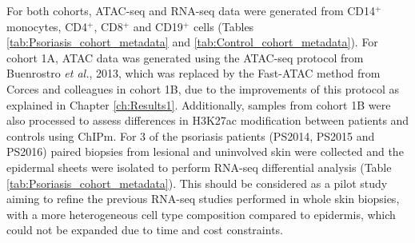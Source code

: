 For both cohorts, ATAC-seq and RNA-seq data were generated from CD14$^+$ monocytes, CD4$^+$, CD8$^+$ and CD19$^+$ cells (Tables \ref{tab:Psoriasis_cohort_metadata} and \ref{tab:Control_cohort_metadata}). For cohort 1A, ATAC data was generated using the ATAC-seq protocol from Buenrostro \textit{et al.}, 2013, which was replaced by the Fast-ATAC method from Corces and colleagues \parencite{Corces2016} in cohort 1B, due to the improvements of this protocol as explained in Chapter \ref{ch:Results1}. Additionally, samples from cohort 1B were also processed to assess differences in H3K27ac modification between patients and controls using ChIPm. For 3 of the psoriasis patients (PS2014, PS2015 and PS2016) paired biopsies from lesional and uninvolved skin were collected and the epidermal sheets were isolated to perform RNA-seq differential analysis (Table \ref{tab:Psoriasis_cohort_metadata}). This should be considered as a pilot study aiming to refine the previous RNA-seq studies performed in whole skin biopsies, with a more heterogeneous cell type composition compared to epidermis, which could not be expanded due to time and cost constraints.




%


